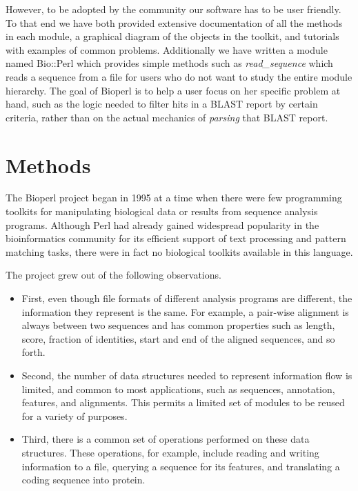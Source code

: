 \documentclass[12pt]{article}
\begin{document}
However, to be adopted by the community our software has to be user
friendly.  To that end we have both provided extensive documentation of
all the methods in each module, a graphical diagram of the objects in
the toolkit, and tutorials with examples of common problems.
Additionally we have written a module named Bio::Perl which provides
simple methods such as \textit{read\_sequence} which reads a sequence
from a file for users who do not want to study the entire module
hierarchy.  The goal of Bioperl is to help a user focus on her
specific problem at hand, such as the logic needed to filter hits in a
BLAST \cite{blast} report by certain criteria, rather than on the
actual mechanics of \textit{parsing} that BLAST report.

\section{Methods}

The Bioperl project began in 1995 \cite{chervitz-bits} at a time when
there were few programming toolkits for manipulating biological data
or results from sequence analysis programs.  Although Perl had already
gained widespread popularity in the bioinformatics community for its
efficient support of text processing and pattern matching tasks, there
were in fact no biological toolkits available in this language.

The project grew out of the following observations.  
\begin{itemize}

\item First, even though file formats of different analysis programs
are different, the information they represent is the same.  For
example, a pair-wise alignment is always between two sequences and has
common properties such as length, score, fraction of identities, start
and end of the aligned sequences, and so forth.

\item Second, the number of data structures needed to represent
information flow is limited, and common to most applications, such as
sequences, annotation, features, and alignments.  This permits a limited
set of modules to be reused for a variety of purposes.

\item Third, there is a common set of operations performed on these
data structures.  These operations, for example, include reading and
writing information to a file, querying a sequence for its features,
and translating a coding sequence into protein.

\end{itemize}
\end{document}
